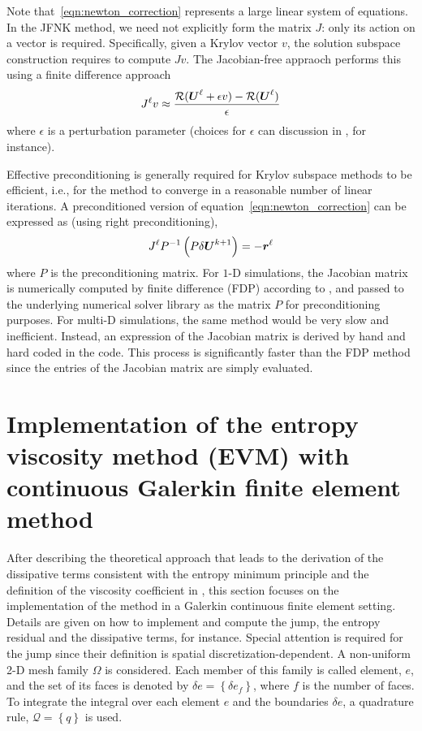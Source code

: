 Note that~\eqref{eqn:newton_correction} represents a large
linear system of equations.  In the JFNK method, we need not
explicitly form the matrix $J$: only its action on a vector is required. Specifically, given a Krylov vector $v$, the solution subspace construction requires to compute $Jv$. The Jacobian-free appraoch performs this using a finite difference approach
\begin{equation}
J^\ell v \approx \frac{ \mathcal{R} (\boldsymbol U^\ell + \epsilon v) - \mathcal{R} (\boldsymbol U^\ell)}{\epsilon}
\end{equation}
where $\epsilon$ is a perturbation parameter (choices for $\epsilon$ can discussion in \cite{Knoll_2004}, for instance).

Effective preconditioning is generally required for Krylov subspace
methods to be efficient, i.e., for the method to converge in a
reasonable number of linear iterations. A preconditioned version of
equation~\eqref{eqn:newton_correction} can be expressed as (using
right preconditioning),
\begin{equation}
  \label{eqn:newton_correction_preconditioned}
  J^\ell P^{-1} \left(P \delta \boldsymbol U^{k+1} \right)= -\boldsymbol r^\ell
\end{equation}
where $P$ is the preconditioning matrix. For $1$-D simulations, the Jacobian matrix is numerically computed by finite difference (FDP) according to , and passed to the underlying numerical solver
library as the matrix $P$ for preconditioning purposes. For multi-D simulations, the same method would be very slow and inefficient. Instead, an expression of the Jacobian matrix is derived by hand and hard coded in the code. This process is significantly faster than the FDP method since the entries of the Jacobian matrix are simply evaluated.

\section{Implementation of the entropy viscosity method (EVM) with continuous Galerkin finite element method}\label{sect:ev_impl_sect2}
After describing the theoretical approach that leads to the derivation of the dissipative terms consistent with the entropy minimum principle and the definition of the viscosity coefficient in , this section focuses on the implementation of the method in a Galerkin continuous finite element setting. Details are given on how to implement and compute the jump, the entropy residual and the dissipative terms, for instance. Special attention is required for the jump since their definition is spatial discretization-dependent. A non-uniform 2-D mesh family $\Omega$ is considered. Each member of this family is called element, $e$, and the set of its faces is denoted by $\delta e = \left\{ \delta e_f \right\}$, where $f$ is the number of faces. To integrate the integral over each element $e$ and the boundaries $\delta e$, a quadrature rule, $\mathcal{Q} = \left\{ q \right\}$ is used.

